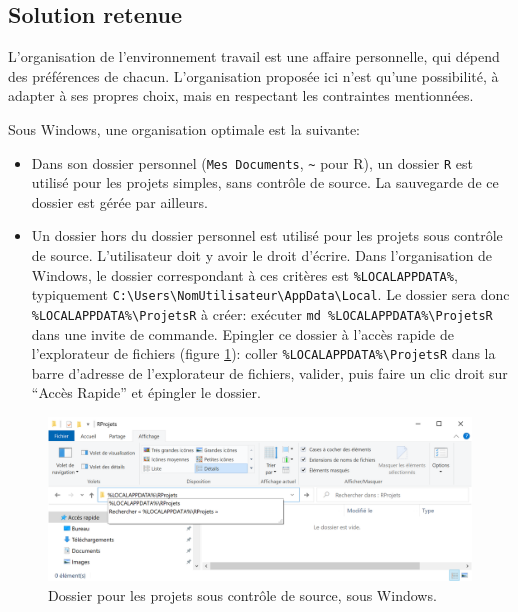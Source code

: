 \documentclass[
  12pt,
  french,
  a4paper,
  extrafontsizes,onecolumn,openright
  ]{memoir}
\providecommand{\tightlist}{%
  \setlength{\itemsep}{0pt}\setlength{\parskip}{0pt}}
\begin{document}
\hypertarget{sec:solution-dossiers}{%
\subsection{Solution retenue}\label{sec:solution-dossiers}}

L'organisation de l'environnement travail est une affaire personnelle, qui dépend des préférences de chacun.
L'organisation proposée ici n'est qu'une possibilité, à adapter à ses propres choix, mais en respectant les contraintes mentionnées.

Sous Windows, une organisation optimale est la suivante:

\begin{itemize}
\tightlist
\item
  Dans son dossier personnel (\texttt{Mes\ Documents}, \texttt{\textasciitilde{}} pour R), un dossier \texttt{R} est utilisé pour les projets simples, sans contrôle de source.
  La sauvegarde de ce dossier est gérée par ailleurs.
\item
  Un dossier hors du dossier personnel est utilisé pour les projets sous contrôle de source.
  L'utilisateur doit y avoir le droit d'écrire.
  Dans l'organisation de Windows, le dossier correspondant à ces critères est \texttt{\%LOCALAPPDATA\%}, typiquement \texttt{C:\textbackslash{}Users\textbackslash{}NomUtilisateur\textbackslash{}AppData\textbackslash{}Local}.
  Le dossier sera donc \texttt{\%LOCALAPPDATA\%\textbackslash{}ProjetsR} à créer: exécuter \texttt{md\ \%LOCALAPPDATA\%\textbackslash{}ProjetsR} dans une invite de commande.
  Epingler ce dossier à l'accès rapide de l'explorateur de fichiers (figure \ref{fig:R-ProjetsR}): coller \texttt{\%LOCALAPPDATA\%\textbackslash{}ProjetsR} dans la barre d'adresse de l'explorateur de fichiers, valider, puis faire un clic droit sur \enquote{Accès Rapide} et épingler le dossier.
\end{itemize}



\scriptsize

\begin{figure}

{\centering \includegraphics[width=1\linewidth]{images/R-ProjetsR} 

}

\caption{Dossier pour les projets sous contrôle de source, sous Windows.}\label{fig:R-ProjetsR}
\end{figure}
\end{document}

